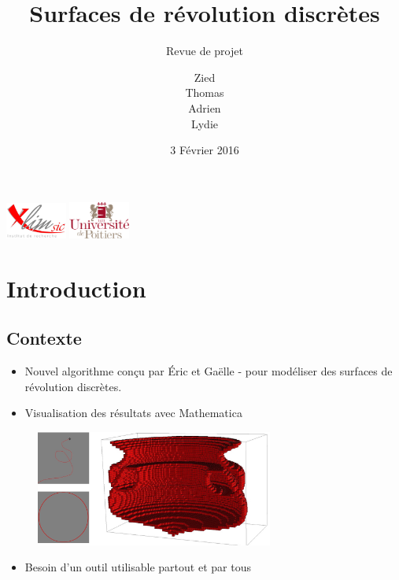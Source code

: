 \documentclass[xcolor=dvipsnames]{beamer}
\title[Revue de projet]{Surfaces de r\'evolution discrètes}
\subtitle{Revue de projet}
\author[]{Zied \smallcaps{Ben} \smallcaps{Othmane} \\ Thomas \smallcaps{Benoist}
	\\ Adrien \smallcaps{Bisutti} \\ Lydie \smallcaps{Richaume}}
\institute{Universit\'e de Poitiers}
\date{3 Février 2016}
\begin{document}


\begin{frame}
	\titlepage
	\includegraphics[width=2cm]{../Images/logo-Xlim.png}
	\hfill
	\includegraphics[width=2cm]{../Images/logo_univ_poitiers.png}
\end{frame}




\section{Introduction}

	\subsection{Contexte}
	\begin{frame}{\subsecname}
		\begin{itemize}
			\item Nouvel algorithme conçu par \'Eric  et
				Ga\"elle - pour mod\'eliser
				des surfaces de r\'evolution discr\`etes.
			\item Visualisation des r\'esultats avec Mathematica
		\end{itemize}
		\begin{figure}
			\includegraphics[height=3.8cm]{../Images/revolution2.jpg}
		\end{figure}
		\begin{itemize}
			\item Besoin d'un outil utilisable partout et par tous
		\end{itemize}
	\end{frame}
\end{document}
